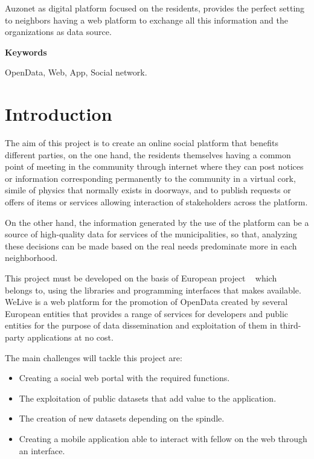 \documentclass{DeustoFDP}
\begin{document}
Auzonet as digital platform focused on the residents, provides
the perfect setting to neighbors having a web platform
to exchange all this information and the organizations as data source.

\vspace{2em}

{\Large\bfseries\sectionfont Keywords}
\vspace{3\medskipamount}

OpenData, Web, App, Social network.

\cleardoublepage\tableofcontents
\cleardoublepage\listoffigures
\cleardoublepage\listoftables
\cleardoublepage\listoflistings

\mainmatter
\pagestyle{phdthesis}

\chapter{Introduction}\label{cha:introduction}
The aim of this project is to create an online social platform that benefits different parties, on the one hand, the residents themselves having a common point of meeting in the community  through internet where they can post notices or information corresponding permanently to the community in a virtual cork, simile of physics that normally exists in doorways, and to publish requests or offers of items or services allowing interaction of stakeholders across the platform.

On the other hand, the information generated by the use of the platform can be a source of high-quality data for services of the municipalities, so that, analyzing these decisions can be made based on the real needs predominate more in each neighborhood.

This project must be developed on the basis of European project ~\cite{WeLive} which ~\cite{DeustoTech} ~\cite{Morelab} belongs to, using the libraries and programming interfaces that makes available. WeLive is a web platform for the promotion of OpenData created by several European entities that provides a range of services for developers and public entities for the purpose of data dissemination and exploitation of them in third-party applications at no cost.

The main challenges will tackle this project are:

\begin{itemize}
    \item Creating a social web portal with the required functions.
    \item The exploitation of public datasets that add value to the application.
    \item The creation of new datasets depending on the spindle.
    \item Creating a mobile application able to interact with fellow on the web through an interface.
\end{itemize}
\end{document}
